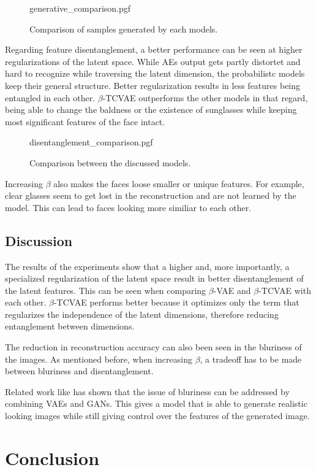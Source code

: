 \documentclass[a4paper]{IEEEtran}
\begin{document}
\begin{figure}
	\centering
    {generative_comparison.pgf}
    \caption{Comparison of samples generated by each models.}
    \label{fig:generative}
\end{figure}

Regarding feature disentanglement, a better performance can be seen at higher regularizations of the latent space. While AEs output gets partly distortet and hard to recognize while traversing the latent dimension, the probabilistc models keep their general structure. Better regularization results in less features being entangled in each other. $\beta$-TCVAE outperforms the other models in that regard, being able to change the baldness or the existence of sunglasses while keeping most significant features of the face intact.

\begin{figure*}[h]
	\centering
    {disentanglement_comparison.pgf}
    \caption{Comparison between the discussed models.}
    \label{fig:disentanglement}
\end{figure*}

Increasing $\beta$ also makes the faces loose smaller or unique features. For example, clear glasses seem to get lost in the reconstruction and are not learned by the model. This can lead to faces looking more similiar to each other.

\subsection{Discussion}
The results of the experiments show that a higher and, more importantly, a specialized regularization of the latent space result in better disentanglement of the latent features. This can be seen when comparing $\beta$-VAE and $\beta$-TCVAE with each other. $\beta$-TCVAE performs better because it optimizes only the term that regularizes the independence of the latent dimensions, therefore reducing entanglement between dimensions.

The reduction in reconstruction accuracy can also been seen in the bluriness of the images. As mentioned before, when increasing $\beta$, a tradeoff has to be made between bluriness and disentanglement.

Related work like \cite{DBLP:journals/corr/BaoCWLH17} has shown that the issue of bluriness can be addressed by combining VAEs and GANs. This gives a model that is able to generate realistic looking images while still giving control over the features of the generated image.

\section{Conclusion}



\end{document}
